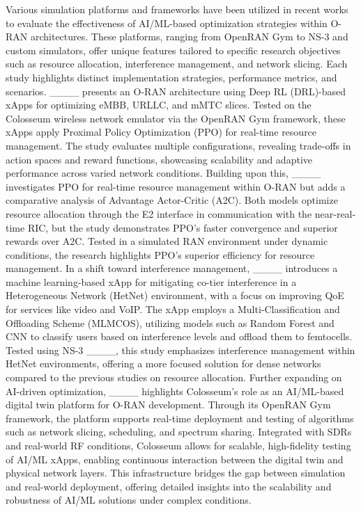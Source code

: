 Various simulation platforms and frameworks have been utilized in recent works to evaluate the effectiveness of AI/ML-based optimization strategies within O-RAN architectures. These platforms, ranging from OpenRAN Gym to NS-3 and custom simulators, offer unique features tailored to specific research objectives such as resource allocation, interference management, and network slicing. Each study highlights distinct implementation strategies, performance metrics, and scenarios.
____ presents an O-RAN architecture using Deep RL (DRL)-based xApps for optimizing eMBB, URLLC, and mMTC slices. Tested on the Colosseum wireless network emulator via the OpenRAN Gym framework, these xApps apply Proximal Policy Optimization (PPO) for real-time resource management. The study evaluates multiple configurations, revealing trade-offs in action spaces and reward functions, showcasing scalability and adaptive performance across varied network conditions.
Building upon this, ____ investigates PPO for real-time resource management within O-RAN but adds a comparative analysis of Advantage Actor-Critic (A2C). Both models optimize resource allocation through the E2 interface in communication with the near-real-time RIC, but the study demonstrates PPO's faster convergence and superior rewards over A2C. Tested in a simulated RAN environment under dynamic conditions, the research highlights PPO's superior efficiency for resource management.
In a shift toward interference management, ____ introduces a machine learning-based xApp for mitigating co-tier interference in a Heterogeneous Network (HetNet) environment, with a focus on improving QoE for services like video and VoIP. The xApp employs a Multi-Classification and Offloading Scheme (MLMCOS), utilizing models such as Random Forest and CNN to classify users based on interference levels and offload them to femtocells. Tested using NS-3 ____, this study emphasizes interference management within HetNet environments, offering a more focused solution for dense networks compared to the previous studies on resource allocation.
Further expanding on AI-driven optimization, ____ highlights Colosseum's role as an AI/ML-based digital twin platform for O-RAN development. Through its OpenRAN Gym framework, the platform supports real-time deployment and testing of algorithms such as network slicing, scheduling, and spectrum sharing. Integrated with SDRs and real-world RF conditions, Colosseum allows for scalable, high-fidelity testing of AI/ML xApps, enabling continuous interaction between the digital twin and physical network layers. This infrastructure bridges the gap between simulation and real-world deployment, offering detailed insights into the scalability and robustness of AI/ML solutions under complex conditions.

